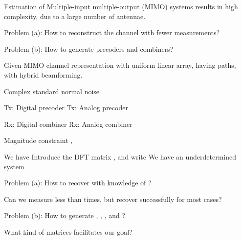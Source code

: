 
\Title {\TitleText}
\blank [big]

\Subtitle {\AuthorText}
\blank [big]

\Subsubtitle {\InstitutionText}

\page [yes]
{
\blank [big]

\I Estimation of Multiple-input multiple-output (MIMO) systems results in high complexity, due to a large number of antennae.

\I Problem (a): How to reconstruct the channel with fewer measurements?

\I Problem (b): How to generate precoders and combiners?
}
{
\I Given MIMO channel representation  with uniform linear array, having  paths, with hybrid beamforming.

\I Complex standard normal noise 

\I Tx: Digital precoder 
\I Tx: Analog precoder 

\I Rx: Digital combiner 
\I Rx: Analog combiner 

\I Magnitude constraint , 
}
{
\I We have 
\I Introduce the DFT matrix , and write
\I We have an underdetermined system 
}
{
\I Problem (a): How to recover  with knowledge of ?

Can we measure less than  times, but recover successfully for most cases?

\I Problem (b): How to generate , , , and ?

What kind of matrices facilitates our goal?
}
